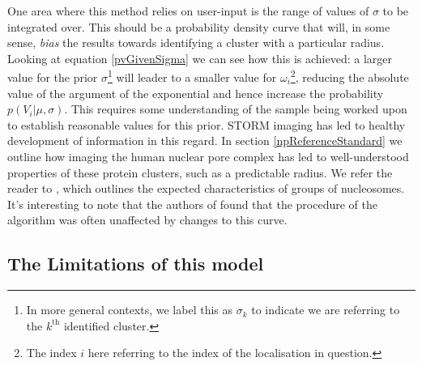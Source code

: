 \documentclass[11pt]{article}
\begin{document}
One area where this method relies on user-input is the range of values of $\sigma$ to be integrated over. This should be a probability density curve that will, in some sense, \textit{bias} the results towards identifying a cluster with a particular radius.
Looking at equation \ref{pvGivenSigma} we can see how this is achieved: a larger value for the prior $\sigma$\footnote{In more general contexts, we label this as $\sigma_k$ to indicate we are referring to the $k^\text{th}$ identified cluster.} will leader to a smaller value for $\omega_i$\footnote{The index $i$ here referring to the index of the localisation in question.}, reducing the absolute value of the argument of the exponential and hence increase the probability $p(V_i|\mu,\sigma)$.
This requires some understanding of the sample being worked upon to establish reasonable values for this prior. STORM imaging has led to healthy development of information in this regard. In section \ref{npReferenceStandard} we outline how imaging the human nuclear pore complex has led to well-understood properties of these protein clusters, such as a predictable radius. 
We refer the reader to \cite{ricci2015chromatin}, which outlines the expected characteristics of groups of nucleosomes. It's interesting to note that the authors of \cite{griffie2016bayesian} found that the procedure of the algorithm was often unaffected by changes to this curve.


\subsection{The Limitations of this model}

\end{document}
